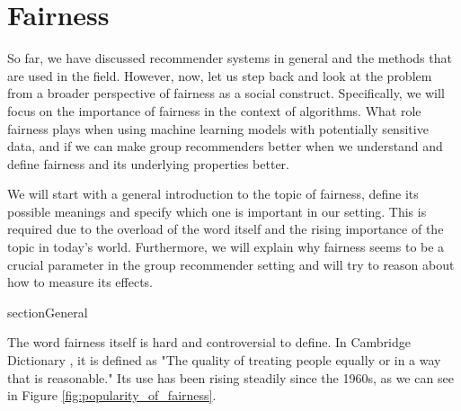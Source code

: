 \chapter{Fairness} \label{chap:fairness}

So far, we have discussed recommender systems in general and the methods that are used in the field. However, now, let us step back and look at the problem from a broader perspective of fairness as a social construct.
Specifically, we will focus on the importance of fairness in the context of algorithms.
What role fairness plays when using machine learning models with potentially sensitive data, and if we can make group recommenders better when we understand and define fairness and its underlying properties better.

We will start with a general introduction to the topic of fairness, define its possible meanings and specify which one is important in our setting.
This is required due to the overload of the word itself and the rising importance of the topic in today's world. Furthermore, we will explain why fairness seems to be a crucial parameter in the group recommender setting and will try to reason about how to measure its effects.




section{General} \label{sec:02_general}

The word fairness itself is hard and controversial to define. In Cambridge Dictionary \cite{fairness_definition}, it is defined as "The quality of treating people equally or in a way that is reasonable." Its use has been rising steadily since the 1960s, as we can see in Figure \ref{fig:popularity_of_fairness}.

